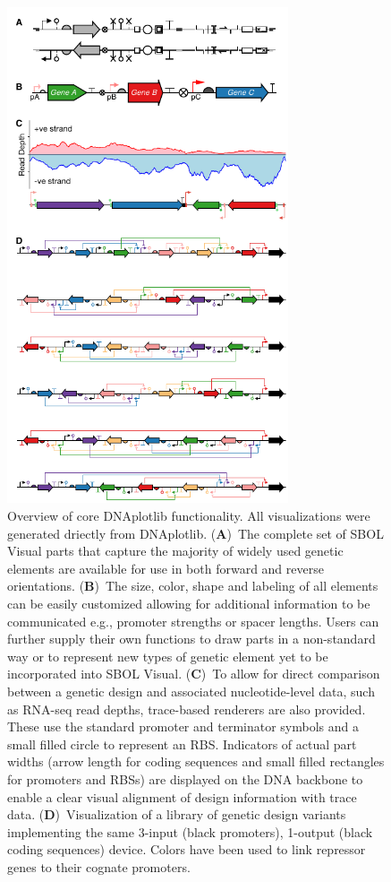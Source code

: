 \documentclass{bioinfo}
\begin{document}
\begin{figure}[tb]
\centering
\includegraphics[width=8.3cm]{Figure1.pdf}
\caption{\label{fig:overview}Overview of core DNAplotlib functionality. All visualizations were generated driectly from DNAplotlib. (\textbf{A})~The complete set of SBOL Visual parts that capture the majority of widely used genetic elements are available for use in both forward and reverse orientations. (\textbf{B})~The size, color, shape and labeling of all elements can be easily customized allowing for additional information to be communicated e.g., promoter strengths or spacer lengths. Users can further supply their own functions to draw parts in a non-standard way or to represent new types of genetic element yet to be incorporated into SBOL Visual. (\textbf{C})~To allow for direct comparison between a genetic design and associated nucleotide-level data, such as RNA-seq read depths, trace-based renderers are also provided. These use the standard promoter and terminator symbols and a small filled circle to represent an RBS. Indicators of actual part widths (arrow length for coding sequences and small filled rectangles for promoters and RBSs) are displayed on the DNA backbone to enable a clear visual alignment of design information with trace data. (\textbf{D})~Visualization of a library of genetic design variants implementing the same 3-input (black promoters), 1-output (black coding sequences) device. Colors have been used to link repressor genes to their cognate promoters.}
\end{figure}
\end{document}
